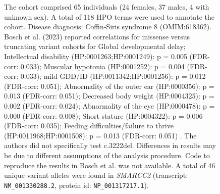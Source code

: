 \begin{figure}[htbp]
\caption{The cohort comprised 65 individuals (24 females, 37 males, 4 with unknown sex). A total of 118 HPO terms were used to annotate the cohort. 
Disease diagnosis: Coffin-Siris syndrome 8 (OMIM:618362). Bosch et al. (2023) reported correlations for  missense versus truncating variant cohorts for 
Global developmental delay; Intellectual disability (HP:0001263;HP:0001249): p = 0.005 (FDR-corr: 0.033); Muscular hypotonia (HP:0001252): p = 0.004 (FDR-corr: 0.033);
mild GDD/ID (HP:0011342;HP:0001256): p = 0.012 (FDR-corr: 0.051); Abnormality of the outer ear (HP:0000356): p = 0.013 (FDR-corr: 0.051); 
Decreased body weight (HP:0004325): p = 0.002 (FDR-corr: 0.024); Abnormality of the eye (HP:0000478): p = 0.000 (FDR-corr: 0.008);
Short stature (HP:0004322): p = 0.006 (FDR-corr: 0.035); Feeding difficulties/failure to thrive (HP:0011968;HP:0001508): p = 0.013 (FDR-corr: 0.051) \cite{PMID_37551667}. 
The authors did not specifically test c.3222del.
Differences in results may be due to different assumptions of the analysis procedure.
Code to reproduce the results in Bosch et al. was not available.
A total of 46 unique variant alleles were found in \textit{SMARCC2} (transcript: \texttt{NM\_001330288.2}, protein id: \texttt{NP\_001317217.1}).}
\end{figure}
